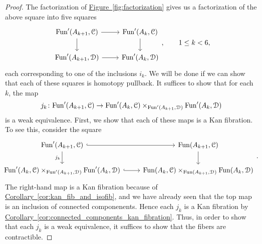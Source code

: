 \documentclass[main.tex]{subfiles}
\begin{document}
\begin{proof}
  The factorization of \hyperref[fig:factorization]{Figure~\ref*{fig:factorization}} gives us a factorization of the above square into five squares
  \begin{equation*}
    \begin{tikzcd}
      \Fun'(A_{k+1}, \category{C})
      \arrow[r]
      \arrow[d]
      & \Fun'(A_{k}, \category{C})
      \arrow[d]
      \\
      \Fun'(A_{k+1}, \category{D})
      \arrow[r]
      & \Fun'(A_{k}, \category{D})
    \end{tikzcd},
    \qquad1 \leq k < 6,
  \end{equation*}
  each corresponding to one of the inclusions $i_{k}$. We will be done if we can show that each of these squares is homotopy pullback. It suffices to show that for each $k$, the map
  \begin{equation*}
    j_{k}\colon \mathrm{Fun}'(A_{k+1}, \mathcal{C})
    \to
    \mathrm{Fun}'(A_{k}, \mathcal{C})
    \times_{\mathrm{Fun}'(A_{k+1}, \mathcal{D})}
    \mathrm{Fun}'(A_{k}, \mathcal{D})
  \end{equation*}
  is a weak equivalence. First, we show that each of these maps is a Kan fibration. To see this, consider the square
  \begin{equation*}
    \noindent\makebox[\textwidth]{%
      \begin{tikzcd}[ampersand replacement=\&]
        \Fun'(A_{k+1}, \category{C})
        \arrow[r, hook]
        \arrow[d, swap, "j_{k}"]
        \& \Fun(A_{k+1}, \category{C})
        \arrow[d]
        \\
        \Fun'(A_{k}, \category{C})
        \times_{\Fun'(A_{k+1}, \category{D})}
        \Fun'(A_{k}, \category{D})
        \arrow[r, hook]
        \& \Fun(A_{k}, \category{C})
        \times_{\Fun(A_{k+1}, \category{D})}
        \Fun(A_{k}, \category{D})
      \end{tikzcd}.
    }
  \end{equation*}
  The right-hand map is a Kan fibration because of \hyperref[cor:kan_fib_and_isofib]{Corollary~\ref*{cor:kan_fib_and_isofib}}, and we have already seen that the top map is an inclusion of connected componenents. Hence each $j_{k}$ is a Kan fibration by \hyperref[cor:connected_components_kan_fibration]{Corollary~\ref*{cor:connected_components_kan_fibration}}. Thus, in order to show that each $j_{k}$ is a weak equivalence, it suffices to show that the fibers are contractible.


\end{proof}
\end{document}
